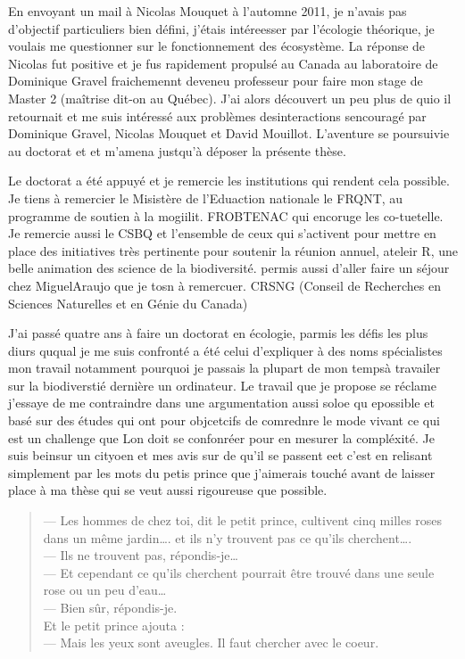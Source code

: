 En envoyant un mail à Nicolas Mouquet à l'automne 2011, je n'avais pas
d'objectif particuliers bien défini, j'étais intéreesser par l'écologie
théorique, je voulais me questionner sur le fonctionnement des
écosystème. La réponse de Nicolas fut positive et je fus rapidement
propulsé au Canada au laboratoire de Dominique Gravel fraichemennt
deveneu professeur pour faire mon stage de Master 2 (maîtrise dit-on au
Québec). J'ai alors découvert un peu plus de quio il retournait et me
suis intéressé aux problèmes desinteractions sencouragé par Dominique
Gravel, Nicolas Mouquet et David Mouillot. L'aventure se poursuivie au
doctorat et et m'amena justqu'à déposer la présente thèse.

Le doctorat a été appuyé et je remercie les institutions qui rendent
cela possible. Je tiens à remercier le Misistère de l'Eduaction
nationale le FRQNT, au programme de soutien à la mogiilit. FROBTENAC qui
encoruge les co-tuetelle. Je remercie aussi le CSBQ et l'ensemble de
ceux qui s'activent pour mettre en place des initiatives très pertinente
pour soutenir la réunion annuel, ateleir R, une belle animation des
science de la biodiversité. permis aussi d'aller faire un séjour chez
MiguelAraujo que je tosn à remercuer. CRSNG (Conseil de Recherches en
Sciences Naturelles et en Génie du Canada)

J'ai passé quatre ans à faire un doctorat en écologie, parmis les défis
les plus diurs ququal je me suis confronté a été celui d'expliquer à des
noms spécialistes mon travail notamment pourquoi je passais la plupart
de mon tempsà travailer sur la biodiverstié dernière un ordinateur. Le
travail que je propose se réclame j'essaye de me contraindre dans une
argumentation aussi soloe qu epossible et basé sur des études qui ont
pour objcetcifs de comrednre le mode vivant ce qui est un challenge que
Lon doit se confonréer pour en mesurer la compléxité. Je suis beinsur un
cityoen et mes avis sur de qu'il se passent eet c'est en relisant
simplement par les mots du petis prince que j'aimerais touché avant de
laisser place à ma thèse qui se veut aussi rigoureuse que possible.

\begin{quote}
--- Les hommes de chez toi, dit le petit prince, cultivent cinq milles
roses dans un même jardin\ldots{}. et ils n'y trouvent pas ce qu'ils
cherchent\ldots{}.\\
--- Ils ne trouvent pas, répondis-je\ldots{}\\
--- Et cependant ce qu'ils cherchent pourrait être trouvé dans une seule
rose ou un peu d'eau\ldots{}\\
--- Bien sûr, répondis-je.\\
Et le petit prince ajouta :\\
--- Mais les yeux sont aveugles. Il faut chercher avec le coeur.
\end{quote}
